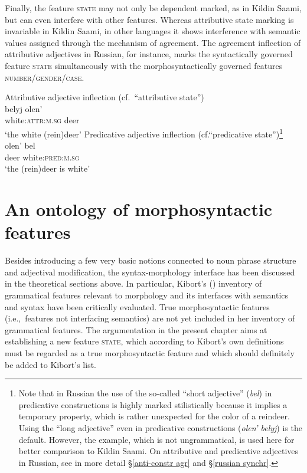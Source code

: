Finally, the feature \textsc{state} may not only be dependent marked, as in Kildin Saami, but can even interfere with other features. Whereas attributive state marking is invariable in Kildin Saami, in other languages it shows interference with semantic values assigned through the mechanism of agreement. The agreement inflection of attributive adjectives in Russian, for instance, marks the syntactically governed feature \textsc{state} simultaneously with the morphosyntactically governed features \textsc{number/gender/case}.
\begin{exe}
\ex\label{state np russian}
\begin{xlist}
\ex 
\rm{Attributive adjective inflection (cf.~“attributive state”)}\\
\gll 	belyj	olen'\\
	white:\textsc{attr:m.sg}	deer\\
\glt 	‘the white (rein)deer’
\ex	
\rm{Predicative adjective inflection (cf.“predicative state”)}\footnote{Note that in Russian the use of the so-called “short adjective” (\textit{bel}) in predicative constructions is highly marked stilistically because it implies a temporary property, which is rather unexpected for the color of a reindeer. Using the “long adjective” even in predicative constructions (\textit{olen' belyj}) is the default. However, the example, which is not ungrammatical, is used here for better comparison to Kildin Saami. On attributive and predicative adjectives in Russian, see in more detail \S\ref{anti-constr agr} and \S\ref{russian synchr}.}
\\
\gll	olen' bel\\
	deer white:\textsc{pred:m.sg}\\
\glt	‘the (rein)deer is white’
\end{xlist}
\end{exe}

\section{An ontology of morphosyntactic features}
Besides introducing a few very basic notions connected to noun phrase structure and adjectival modification, the syntax-morphology interface has been discussed in the theoretical sections above. In particular, Kibort's (\citeyear{kibort2010a}) inventory of grammatical features relevant to morphology and its interfaces with semantics and syntax have been critically evaluated. True morphosyntactic features (i.e.,~features not interfacing semantics) are not yet included in her inventory of grammatical features. The argumentation in the present chapter aims at establishing a new feature \textsc{state}, which according to Kibort's own definitions must be regarded as a true morphosyntactic feature and which should definitely be added to Kibort's list. 

